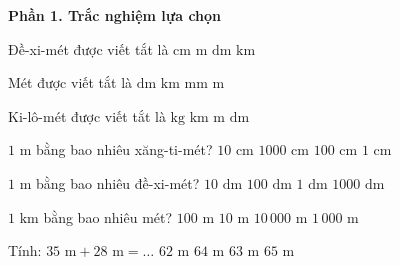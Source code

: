 \textbf{Phần 1. Trắc nghiệm lựa chọn}

\begin{ex} %
Đề-xi-mét được viết tắt là
\choice
{$\text{cm}$}
{$\text{m}$}
{\True $\text{dm}$}
{$\text{km}$}
\end{ex}

\begin{ex} %
Mét được viết tắt là
\choice
{$\text{dm}$}
{$\text{km}$}
{$\text{mm}$}
{\True $\text{m}$}
\end{ex}

\begin{ex} %
Ki-lô-mét được viết tắt là
\choice
{$\text{kg}$}
{\True $\text{km}$}
{$\text{m}$}
{$\text{dm}$}
\end{ex}

\begin{ex} %
$1\text{ m}$ bằng bao nhiêu xăng-ti-mét?
\choice
{$10\text{ cm}$}
{$1000\text{ cm}$}
{\True $100\text{ cm}$}
{$1\text{ cm}$}
\end{ex}

\begin{ex} %
$1\text{ m}$ bằng bao nhiêu đề-xi-mét?
\choice
{\True $10\text{ dm}$}
{$100\text{ dm}$}
{$1\text{ dm}$}
{$1000\text{ dm}$}
\end{ex}

\begin{ex} %
$1\text{ km}$ bằng bao nhiêu mét?
\choice
{$100\text{ m}$}
{$10\text{ m}$}
{$10\,000\text{ m}$}
{\True $1\,000\text{ m}$}
\end{ex}

\begin{ex} %
Tính: $35\text{ m} + 28\text{ m} = \dots$
\choice
{$62\text{ m}$}
{$64\text{ m}$}
{\True $63\text{ m}$}
{$65\text{ m}$}
\end{ex}

